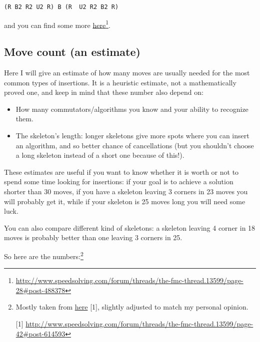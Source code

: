 \documentclass[11pt,a4paper]{book}
\newcommand{\p}{\textquotesingle}
\newcommand{\m}{\texttt}
\newcommand{\ps}{\p\,\,}
\begin{document}
\begin{center}
\m{(R B2 R2 U2 R) B (R\ps U2 R2 B2 R\p)}
\end{center}

and you can find some more \href{https://www.speedsolving.com/forum/threads/the-fmc-thread.13599/page-28\#post-488378}{here}\footnote{\url{http://www.speedsolving.com/forum/threads/the-fmc-thread.13599/page-28\#post-488378}}.

\subsection{Move count (an estimate)}

Here I will give an estimate of how many moves are usually needed for the most common types of insertions. It is a heuristic estimate, not a mathematically proved one, and keep in mind that these number also depend on:

\begin{itemize}
\item How many commutators/algorithms you know and your ability to recognize them.
\item The skeleton's length: longer skeletons give more spots where you can insert an algorithm, and so better chance of cancellations (but you shouldn't choose a long skeleton instead of a short one because of this!).
\end{itemize}

These estimates are useful if you want to know whether it is worth or not to spend some time looking for insertions: if your goal is to achieve a solution shorter than 30 moves, if you have a skeleton leaving 3 corners in 23 moves you will probably get it, while if your skeleton is 25 moves long you will need some luck.

You can also compare different kind of skeletons: a skeleton leaving 4 corner in 18 moves is probably better than one leaving 3 corners in 25.

So here are the numbers:\footnote{Mostly taken from \href{https://www.speedsolving.com/forum/threads/the-fmc-thread.13599/page-42\#post-614593}{here} [1], slightly adjusted to match my personal opinion.

[1] \url{http://www.speedsolving.com/forum/threads/the-fmc-thread.13599/page-42\#post-614593}}
\end{document}
